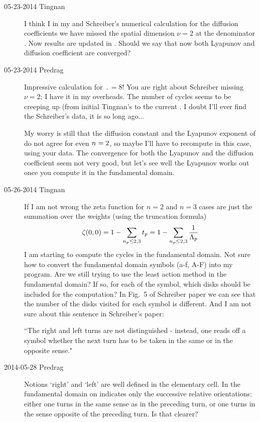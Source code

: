 \begin{description}
\item[05-23-2014 Tingnan]
I think I in my and Schreiber's numerical calculation for the diffusion
coefficients we have missed the spatial dimension $\nu=2$ at the
denominator . Now results are updated in
. Should we say that now both Lyapunov and diffusion
coefficient are converged?

\item[05-23-2014 Predrag]
Impressive calculation for $\period{}=8$!
You are right about Schreiber missing $\nu=2$; I have it in my overheads.
The number of cycles seems to be creeping
up (from initial Tingnan's  to the current .
I doubt I'll ever find the Schreiber's data, it is so long ago...

My worry is still that the diffusion constant and
the Lyapunov exponent of  do not agree for even ${n_{}}=2$, so maybe
I'll have to recompute  in this case, using your
 data.
The convergence for both the Lyapunov and the diffusion
coefficient seem not very good, but let's see well the Lyapunov works out
once you compute it in the fundamental domain.

\item[05-26-2014 Tingnan]
If I am not wrong the zeta function for $n=2$ and $n=3$ cases are just the summation over the weights (using the truncation formula)
\[
\zeta(0,0)=1-\sum_{{n_{p}}\leq2,3}t_{p}=1-\sum_{{n_{p}}\leq2,3} \frac{1}{\Lambda_{p}}
\]
I am starting to compute the cycles in the fundamental domain.
Not sure how to convert the fundamental domain symbols (a-f, A-F) into my program. Are we still trying to use the least action method in the fundamental domain? If so, for each of the symbol, which disks should be included for the computation? In Fig.~5 of Schreiber paper we can see that the number of the disks visited for each symbol
is different. And I am not sure about this sentence in Schreiber's paper:

``The right and left turns are not distinguished - instead,  one reads
off a symbol whether the next turn has to be taken in the same or in the
opposite sense."

\item[2014-05-28 Predrag] Notions `right' and `left' are well defined in
the elementary cell. In the fundamental domain on indicates only the
successive relative orientations: either one turns in the same sense as
in the preceding turn, or one turns in the sense opposite of the
preceding turn. Is that clearer?


\end{description}
